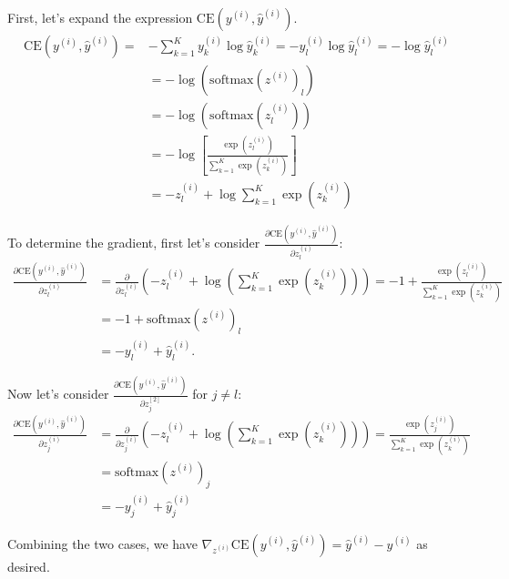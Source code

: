 \begin{answer}

First, let's expand the expression $\mathrm{CE}(y^{(i)}, \hat{y}^{(i)})$.
  \begin{align*}
\mathrm{CE}(y^{(i)},\hat{y}^{(i)}) = & - \sum_{k=1}^K y^{(i)}_k \log \hat{y}^{(i)}_k =  - y^{(i)}_l \log \hat{y}^{(i)}_l = - \log \hat{y}^{(i)}_l \\
& =  - \log (\mathrm{softmax}(z^{(i)}) _l)  \\
& =  - \log (\mathrm{softmax}(z^{(i)}_l))  \\
& =  - \log \left[ \frac{\exp(z^{(i)}_l)}{\sum_{k=1}^K \exp(z_k^{(i)})} \right]  \\
& =  - z^{(i)}_l + \log \sum_{k=1}^K \exp(z^{(i)}_k)
  \end{align*}

  To determine the gradient, first let's consider $\displaystyle \frac{\partial \mathrm{CE}(y^{(i)},\hat{y}^{(i)}) }{ \partial z^{(i)}_l}$:
  \begin{align*}
  \frac{\partial \mathrm{CE}(y^{(i)},\hat{y}^{(i)}) }{ \partial z^{(i)}_l} &=  \frac{\partial  }{ \partial z^{(i)}_l}(-z^{(i)}_l + \log (\sum_{k=1}^K \exp(z^{(i)}_k))) = -1 + \frac{\exp(z^{(i)}_l)}{\sum_{k=1}^K \exp(z^{(i)}_k)} \\
  &= -1 + \mathrm{softmax}(z^{(i)})_l \\
  &= -y^{(i)}_l + \hat{y}^{(i)}_l.
  \end{align*}

  Now let's consider $\displaystyle \frac{\partial \mathrm{CE}(y^{(i)},\hat{y}^{(i)}) }{ \partial z^{[2]}_j}$ for $j \neq l$:
  \begin{align*}
  \frac{\partial \mathrm{CE}(y^{(i)},\hat{y}^{(i)}) }{ \partial z^{(i)}_j} &=  \frac{\partial  }{ \partial z^{(i)}_j}(- z^{(i)}_l + \log (\sum_{k=1}^K \exp(z^{(i)}_k))) = \frac{\exp(z^{(i)}_j)}{\sum_{k=1}^K \exp(z^{(i)}_k)} \\
  &= \mathrm{softmax}(z^{(i)})_j \\
  &= -y^{(i)}_j + \hat{y}^{(i)}_j
  \end{align*}

  Combining the two cases, we have $ \nabla_{z^{(i)}} \mathrm{CE}(y^{(i)}, \hat{y}^{(i)}) = \hat{y}^{(i)} - y^{(i)} $ as desired.

\end{answer}
   
  
